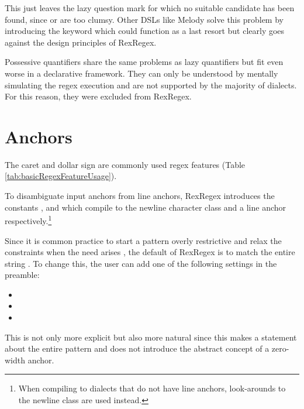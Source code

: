 This just leaves the lazy question mark  for which no suitable candidate has been found, since  or  are too clumsy. Other DSLs like Melody \cite{RegexDslMelody} solve this problem by introducing the  keyword which could function as a last resort but clearly goes against the design principles of RexRegex.

Possessive quantifiers share the same problems as lazy quantifiers but fit even worse in a declarative framework. They can only be understood by mentally simulating the regex execution and are not supported by the majority of dialects. For this reason, they were excluded from RexRegex.

\section{Anchors} \label{sec:dslAnchors}

The caret \pattern{\caret} and dollar sign \pattern{\$} are commonly used regex features (Table \ref{tab:basicRegexFeatureUsage}). 

To disambiguate input anchors from line anchors, RexRegex introduces the constants ,  and  
which compile to the newline character class and a line anchor respectively.\footnote{When compiling to dialects that do not have line anchors, look-arounds to the newline class are used instead.} 

Since it is common practice to start a pattern overly restrictive and relax the constraints when the need arises \cite{RegexesAreHard}, the default of RexRegex is to match the entire string \pattern{\caret\placeholder\dollar}. To change this, the user can add one of the following  settings in the preamble:

\begin{itemize}
    \setlength\itemsep{0em}
    \vspace{-.7em}
    \item {}
    \item {}
    \item {}
    \vspace{-.7em}
\end{itemize}

 This is not only more explicit but also more natural since this makes a statement about the entire pattern and does not introduce the abstract concept of a zero-width anchor.

